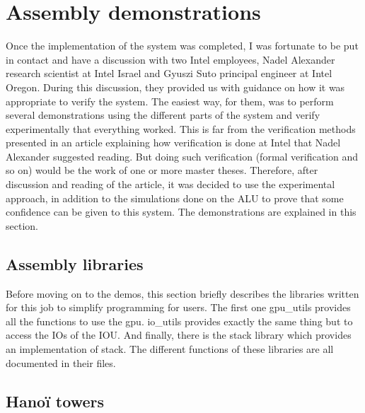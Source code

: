 \section{Assembly demonstrations}

Once the implementation of the system was completed, I was fortunate to be put in contact and have 
a discussion with two Intel employees, Nadel Alexander research scientist at Intel Israel and 
Gyuszi Suto principal engineer at Intel Oregon. During this discussion, they provided us with 
guidance on how it was appropriate to verify the system. The easiest way, for them, was to perform 
several demonstrations using the different parts of the system and verify experimentally that 
everything worked. This is far from the verification methods presented in an article \cite{intel} 
explaining how verification is done at Intel that Nadel Alexander suggested reading. But doing such 
verification (formal verification and so on) would be the work of one or more master theses. 
Therefore, after discussion and reading of the article, it was decided to use the experimental 
approach, in addition to the simulations done on the ALU to prove that some confidence can be given 
to this system. The demonstrations are explained in this section.

\subsection{Assembly libraries}

Before moving on to the demos, this section briefly describes the libraries written for this job to 
simplify programming for users. The first one gpu\_utils provides all the functions to use the gpu. 
io\_utils provides exactly the same thing but to access the IOs of the IOU. And finally, there is 
the stack library which provides an implementation of stack. The different functions of these 
libraries are all documented in their files.

\subsection{Hanoï towers}

